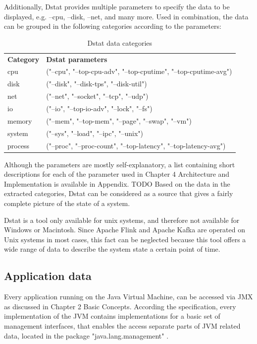 Additionally, Dstat provides multiple parameters to specify the data to be displayed, e.g.
--cpu, --disk, --net, and many more. Used in combination, the data can be grouped in the
following categories according to the parameters:

\begin{table}[H]
    \begin{tabular}{ll}
        \textbf{Category} & \textbf{Dstat parameters} \\
        cpu & ("--cpu", "--top-cpu-adv", "--top-cputime", "--top-cputime-avg")\\
        disk & ("--disk", "--disk-tps", "--disk-util")\\
        net & ("--net", "--socket", "--tcp", "--udp")\\
        io & ("--io", "--top-io-adv", "--lock", "--fs")\\
        memory & ("--mem", "--top-mem", "--page", "--swap", "--vm")\\
        system & ("--sys", "--load", "--ipc", "--unix")\\
        process & ("--proc", "--proc-count", "--top-latency", "--top-latency-avg")\\
    \end{tabular}
    \caption{Dstat data categories}
    \label{tbl:dstatcategories}
\end{table}

Although the parameters are mostly self-explanatory, a list containing short descriptions
for each of the parameter used in Chapter 4 Architecture and Implementation is available in
Appendix. TODO Based on the data in the extracted categories, Dstat can be considered
as a source that gives a fairly complete picture of the state of a system.

Dstat is a tool only available for unix systems, and therefore not available for Windows or
Macintosh. Since Apache Flink and Apache Kafka are operated on Unix systems in most
cases, this fact can be neglected because this tool offers a wide range of data to describe
the system state a certain point of time.

\subsection{Application data}

Every application running on the Java Virtual Machine, can be accessed via JMX as discussed
in Chapter 2 Basic Concepts. According the specification, every implementation of the JVM contains
implementations for a basic set of management interfaces, that enables the access separate parts of JVM related data,
located in the package "java.lang.management" \cite{Javadoc16}.

